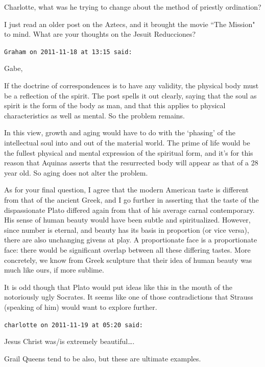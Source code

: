 \begin{footnotesize}
\begin{sffamily}
Charlotte, what was he trying to change about the method of priestly ordination?

I just read an older post on the Aztecs, and it brought the movie ``The Mission" to mind. What are your thoughts on the Jesuit Reducciones?


\hfill

\texttt{Graham on 2011-11-18 at 13:15 said: }

Gabe,

If the doctrine of correspondences is to have any validity, the physical body must be a reflection of the spirit. The post spells it out clearly, saying that the soul as spirit is the form of the body as man, and that this applies to physical characteristics as well as mental. So the problem remains.

In this view, growth and aging would have to do with the `phasing' of the intellectual soul into and out of the material world. The prime of life would be the fullest physical and mental expression of the spiritual form, and it's for this reason that Aquinas asserts that the resurrected body will appear as that of a 28 year old. So aging does not alter the problem.

As for your final question, I agree that the modern American taste is different from that of the ancient Greek, and I go further in asserting that the taste of the dispassionate Plato differed again from that of his average carnal contemporary. His sense of human beauty would have been subtle and spiritualized. However, since number is eternal, and beauty has its basis in proportion (or vice versa), there are also unchanging givens at play. A proportionate face is a proportionate face: there would be significant overlap between all these differing tastes. More concretely, we know from Greek sculpture that their idea of human beauty was much like ours, if more sublime.

It is odd though that Plato would put ideas like this in the mouth of the notoriously ugly Socrates. It seems like one of those contradictions that Strauss (speaking of him) would want to explore further.


\hfill

\texttt{charlotte on 2011-11-19 at 05:20 said: }

Jesus Christ was/is extremely beautiful….

Grail Queens tend to be also, but these are ultimate examples.


\end{sffamily}
\end{footnotesize}
